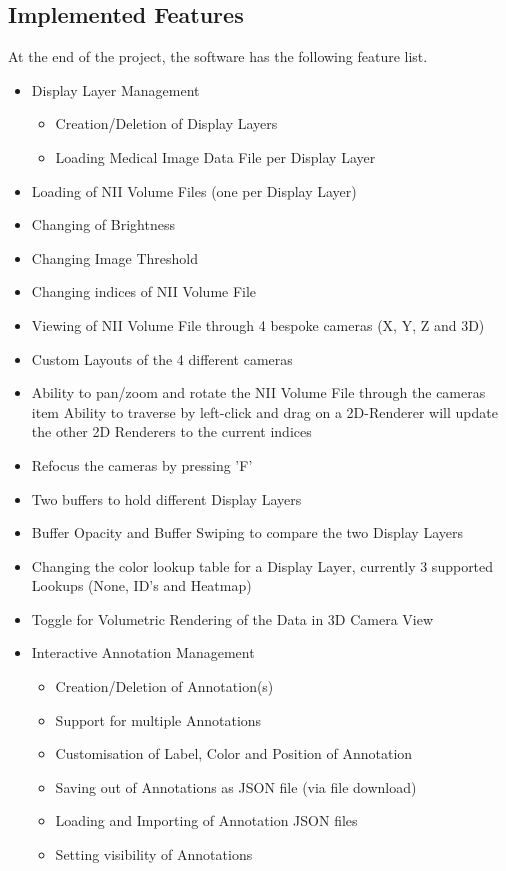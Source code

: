 \documentclass[a4paper,11pt,titlepage]{article}
\begin{document}
\subsection{Implemented Features}

At the end of the project, the software has the following feature list.

\begin{itemize}
\item Display Layer Management

  \begin{itemize}
  \item Creation/Deletion of Display Layers
  \item Loading Medical Image Data File per Display Layer
  \end{itemize}

\item Loading of NII Volume Files (one per Display Layer)	
\item Changing of Brightness
\item Changing Image Threshold
\item Changing indices of NII Volume File
\item Viewing of NII Volume File through 4 bespoke cameras (X, Y, Z and 3D)
\item Custom Layouts of the 4 different cameras
\item Ability to pan/zoom and rotate the NII Volume File through the cameras
  item Ability to traverse by left-click and drag on a 2D-Renderer will update the other 2D Renderers to the current indices
\item Refocus the cameras by pressing 'F'
\item Two buffers to hold different Display Layers
\item Buffer Opacity and Buffer Swiping to compare the two Display Layers
\item Changing the color lookup table for a Display Layer, currently 3 supported Lookups (None, ID's and Heatmap)
\item Toggle for Volumetric Rendering of the Data in 3D Camera View
\item Interactive Annotation Management

  \begin{itemize}
  \item Creation/Deletion of Annotation(s)
  \item Support for multiple Annotations
  \item Customisation of Label, Color and Position of Annotation
  \item Saving out of Annotations as JSON file (via file download)
  \item Loading and Importing of Annotation JSON files
  \item Setting visibility of Annotations
  \end{itemize}


\end{itemize}
\end{document}

